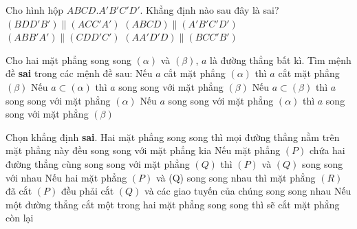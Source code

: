 \begin{ex}%
	Cho hình hộp $ABCD.A'B'C'D'$. Khẳng  định nào sau đây là sai?
	\choice 
		{\True $\left(BDD'B'\right) \parallel  \left(ACC'A'\right)$}
		{$\left(ABCD\right)  \parallel \left(A'B'C'D'\right)$}
		{$\left(ABB'A'\right) \parallel  \left(CDD'C'\right)$}
		{$\left(AA'D'D\right) \parallel \left(BCC'B'\right)$} 
\end{ex}

\begin{ex}%
	Cho hai mặt phẳng song song $\left(\alpha\right)$ và $\left(\beta\right)$, $a$ là đường thẳng bất kì. Tìm  mệnh đề \textbf{sai} trong các mệnh đề sau:
	\choice 
		 {Nếu $a$ cắt mặt phẳng $\left(\alpha\right)$ thì $a$ cắt mặt phẳng $\left(\beta\right)$}
		{Nếu $a\subset\left(\alpha\right)$ thì $a$ song song với mặt phẳng $\left(\beta\right)$} 
		{Nếu $a\subset\left(\beta\right)$ thì $a$ song song với  mặt phẳng $\left(\alpha\right)$}
		{\True Nếu $a$  song song với mặt phẳng $\left(\alpha\right)$ thì $a$ song song với mặt phẳng $\left(\beta\right)$}
\end{ex}

\begin{ex}%
	Chọn khẳng định  \textbf{sai}.
	 \choice
		 {Hai mặt phẳng song song thì mọi đường thẳng nằm trên mặt phẳng này đều song song với mặt phẳng kia}
		{\True Nếu mặt phẳng $(P)$ chứa hai đường thẳng cùng song song với mặt phẳng $(Q)$ thì  $(P)$ và $(Q)$ song song với nhau}
		{Nếu hai mặt phẳng $(P)$ và (Q) song song nhau thì mặt phẳng $(R)$ đã cắt $(P)$ đều phải cắt  $(Q)$ và các giao tuyến của chúng song song nhau}
		{Nếu một đường thẳng cắt một trong hai mặt phẳng  song song thì sẽ cắt mặt phẳng còn lại}
\end{ex}

